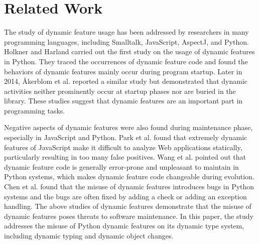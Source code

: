 
\section{Related Work}

The study of dynamic feature usage has been addressed by researchers in many programming languages, including Smalltalk\cite{b6}, JavaScript\cite{b3}, AspectJ\cite{b7}, and Python\cite{b5,b8}. Holkner and Harland\cite{b5} carried out the first study on the usage of dynamic features in Python. They traced the occurrences of dynamic feature code and found the behaviors of dynamic features mainly occur during program startup. Later in 2014, {\AA}kerblom et al. \cite{b8} reported a similar study but demonstrated that dynamic activities neither prominently occur at startup phases nor are buried in the library. These studies suggest that dynamic features are an important part in programming tasks.

Negative aspects of dynamic features were also found during maintenance phase, especially in JavaScript\cite{b9} and Python\cite{b4,b19}. 
Park et al. \cite{b9} found that extremely dynamic features of JavaScript make it difficult to analyze Web applications statically, particularly resulting in too many false positives. 
Wang et al. \cite{b4} pointed out that dynamic feature code is generally error-prone and unpleasant to maintain in Python systems, which makes dynamic feature code changeable during evolution. 
Chen et al. \cite{b19} found that the misuse of dynamic features introduces bugs in Python systems and the bugs are often fixed by adding a check or adding an exception handling. 
The above studies of dynamic features demonstrate that the misuse of dynamic features poses threats to software maintenance. In this paper, the study addresses the misuse of Python dynamic features on its dynamic type system, including dynamic typing and dynamic object changes.


